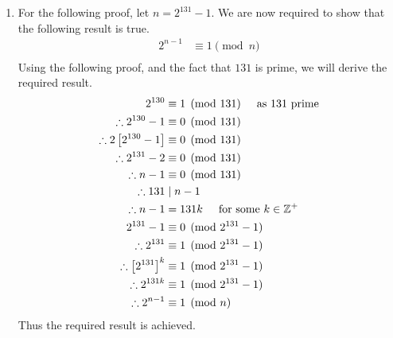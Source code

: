\documentclass[a4paper]{article}
\begin{document}
\begin{enumerate}
\begin{enumerate}
		\pagebreak

		\item For the following proof, let $\displaystyle{n = 2^{131}-1}$. We are now required to show that the following result is true.
		\begin{align*}
		2^{n-1} & \equiv 1 \pmod{n}\\
		\end{align*}
		Using the following proof, and the fact that $\displaystyle{131}$ is prime, we will derive the required result.
		\begin{align*}
		2^{130} & \equiv 1 \pmod{131} \hspace{5mm} \text{as $\displaystyle{131}$ prime}\\
		\therefore 2^{130}-1 & \equiv 0 \pmod{131}\\
		\therefore 2\left[2^{130}-1 \right] & \equiv 0 \pmod{131}\\
		\therefore 2^{131}-2 & \equiv 0 \pmod{131}\\
		\therefore n-1 & \equiv 0 \pmod{131}\\
		\therefore 131  & \mid n-1\\
		\therefore n-1 & = 131k \hspace{5mm} \text{for some $\displaystyle{k\in\mathbb{Z}^+}$}\\
		2^{131} - 1 & \equiv 0 \pmod{2^{131}-1}\\
		\therefore 2^{131} & \equiv 1 \pmod{2^{131}-1}\\
		\therefore \left[{2^{131}}\right]^k & \equiv 1 \pmod{2^{131}-1}\\
		\therefore 2^{131k} & \equiv 1 \pmod{2^{131}-1}\\
		\therefore 2^{n-1} & \equiv 1 \pmod{n}\\
		\end{align*}
		Thus the required result is achieved.

		\bigbreak


\end{enumerate}
\end{enumerate}
\end{document}
